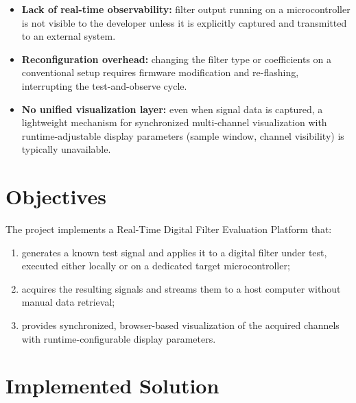 \begin{itemize}
    \item \textbf{Lack of real-time observability:} filter output
          running on a microcontroller is not visible to the developer
          unless it is explicitly captured and transmitted to an external
          system.

    \item \textbf{Reconfiguration overhead:} changing the filter type
          or coefficients on a conventional setup requires firmware
          modification and re-flashing, interrupting the test-and-observe
          cycle.

    \item \textbf{No unified visualization layer:} even when signal
          data is captured, a lightweight mechanism for synchronized
          multi-channel visualization with runtime-adjustable display
          parameters (sample window, channel visibility) is typically
          unavailable.
\end{itemize}


\section{Objectives}
\label{sec:objectives}

The project implements a Real-Time Digital Filter Evaluation Platform that:

\begin{enumerate}
    \item generates a known test signal and applies it to a digital filter under test,
          executed either locally or on a dedicated target microcontroller;
    \item acquires the resulting signals and streams them to a host computer without
          manual data retrieval;
    \item provides synchronized, browser-based visualization of the acquired channels
          with runtime-configurable display parameters.
\end{enumerate}


\section{Implemented Solution}
\label{sec:solution}

